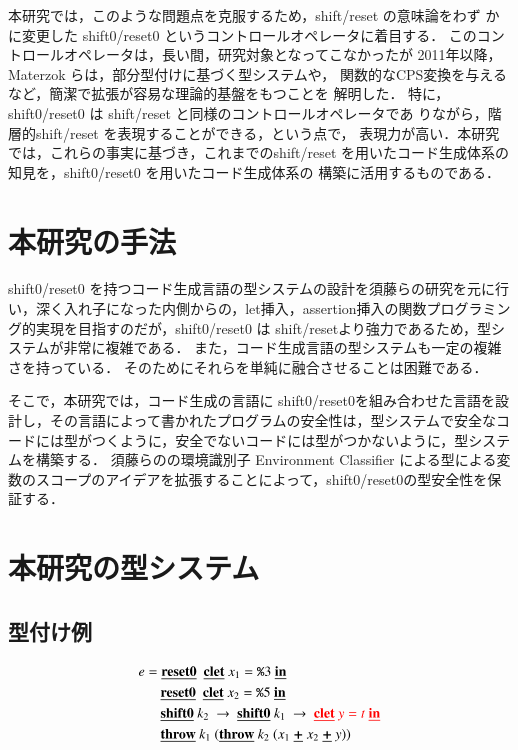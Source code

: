 \documentclass[10pt,a4j,twocolumn]{jarticle}
\newcommand\cResetz{\underline{\textbf{reset0}}}
\newcommand\cShiftz{\underline{\textbf{shift0}}}
\newcommand\cThrow{\underline{\textbf{throw}}}
\newcommand\cPlus{\underline{\textbf{+}}}
\newcommand\cLet{\underline{\textbf{clet}}}
\newcommand\cIn{\underline{\textbf{in}}}
\newcommand\csp[1]{\texttt{\%}{#1}}
\newcommand\red[1]{\textcolor{red}{#1}}
\theoremstyle{definition}
\begin{document}
本研究では，このような問題点を克服するため，shift/reset の意味論をわず
かに変更した shift0/reset0 というコントロールオペレータに着目する．
このコントロールオペレータは，長い間，研究対象となってこなかったが
2011年以降，Materzok らは，部分型付けに基づく型システムや，
関数的なCPS変換を与えるなど，簡潔で拡張が容易な理論的基盤をもつことを
解明した\cite{Materzok2011,materzok2012}．
特に，shift0/reset0 は shift/reset と同様のコントロールオペレータであ
りながら，階層的shift/reset を表現することができる，という点で，
表現力が高い．本研究では，これらの事実に基づき，これまでのshift/reset
を用いたコード生成体系の知見を，shift0/reset0 を用いたコード生成体系の
構築に活用するものである．

\section{本研究の手法}
shift0/reset0 を持つコード生成言語の型システムの設計を須藤らの研究\cite{Sudo2014}を元に行い，深く入れ子になった内側からの，let挿入，assertion挿入の関数プログラミング的実現を目指すのだが，shift0/reset0 は shift/resetより強力であるため，型システムが非常に複雑である．
また，コード生成言語の型システムも一定の複雑さを持っている．
そのためにそれらを単純に融合させることは困難である．

そこで，本研究では，コード生成の言語に shift0/reset0を組み合わせた言語を設計し，その言語によって書かれたプログラムの安全性は，型システムで安全なコードには型がつくように，安全でないコードには型がつかないように，型システムを構築する．
須藤らの\cite{Sudo2014}の環境識別子 Environment Classifier による型による変数のスコープのアイデアを拡張することによって，shift0/reset0の型安全性を保証する．

\section{本研究の型システム}

\subsection{型付け例}
\begin{align*}
  e & = \cResetz ~~\cLet~x_1=\csp{3}~\cIn \\
    & \phantom{=}~~ \cResetz ~~\cLet~x_2=\csp{5}~\cIn \\
    & \phantom{=}~~ \cShiftz~k_2~\to~ \cShiftz~k_1~\to~ \red{\cLet~y=t~\cIn} \\
    & \phantom{=}~~ \cThrow~k_1~(\cThrow~k_2~(x_1~\cPlus~x_2~\cPlus~y))
\end{align*}
\end{document}
